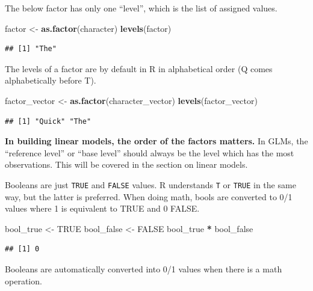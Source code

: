 \documentclass[openany]{book}
\newenvironment{Shaded}{\begin{snugshade}}{\end{snugshade}}
\newcommand{\KeywordTok}[1]{\textcolor[rgb]{0.13,0.29,0.53}{\textbf{#1}}}
\newcommand{\NormalTok}[1]{#1}
\newcommand{\OperatorTok}[1]{\textcolor[rgb]{0.81,0.36,0.00}{\textbf{#1}}}
\newcommand{\OtherTok}[1]{\textcolor[rgb]{0.56,0.35,0.01}{#1}}
\newcommand{\StringTok}[1]{\textcolor[rgb]{0.31,0.60,0.02}{#1}}
\begin{document}
The below factor has only one ``level'', which is the list of assigned values.

\begin{Shaded}
\begin{Highlighting}[]
\NormalTok{factor <-}\StringTok{ }\KeywordTok{as.factor}\NormalTok{(character)}
\KeywordTok{levels}\NormalTok{(factor)}
\end{Highlighting}
\end{Shaded}

\begin{verbatim}
## [1] "The"
\end{verbatim}

The levels of a factor are by default in R in alphabetical order (Q comes alphabetically
before T).

\begin{Shaded}
\begin{Highlighting}[]
\NormalTok{factor_vector <-}\StringTok{ }\KeywordTok{as.factor}\NormalTok{(character_vector)}
\KeywordTok{levels}\NormalTok{(factor_vector)}
\end{Highlighting}
\end{Shaded}

\begin{verbatim}
## [1] "Quick" "The"
\end{verbatim}

\textbf{In building linear models, the order of the factors matters.} In GLMs, the
``reference level'' or ``base level'' should always be the level which has the most
observations. This will be covered in the section on linear models.

Booleans are just \texttt{TRUE} and \texttt{FALSE} values. R understands \texttt{T} or \texttt{TRUE} in the
same way, but the latter is preferred. When doing math, bools are converted to
0/1 values where 1 is equivalent to TRUE and 0 FALSE.

\begin{Shaded}
\begin{Highlighting}[]
\NormalTok{bool_true <-}\StringTok{ }\OtherTok{TRUE}
\NormalTok{bool_false <-}\StringTok{ }\OtherTok{FALSE}
\NormalTok{bool_true }\OperatorTok{*}\StringTok{ }\NormalTok{bool_false}
\end{Highlighting}
\end{Shaded}

\begin{verbatim}
## [1] 0
\end{verbatim}

Booleans are automatically converted into 0/1 values when there is a math operation.
\end{document}

